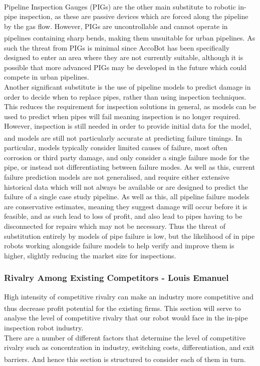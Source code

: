 \documentclass[11pt]{article}		%
\newcommand{\supercite}[1]{\textsuperscript{\cite{#1}}}		%
\begin{document}
				\\
				Pipeline Inspection Gauges (PIGs) are the other main substitute to robotic in-pipe inspection, as these are passive devices which are forced along the pipeline by the gas flow.
				However, PIGs are uncontrollable and cannot operate in pipelines containing sharp bends\supercite{mills2017advances}, making them unsuitable for urban pipelines.
				As such the threat from PIGs is minimal since AccoBot has been specifically designed to enter an area where they are not currently suitable, although it is possible that more advanced PIGs may be developed in the future which could compete in urban pipelines.
				\\
				Another significant substitute is the use of pipeline models to predict damage in order to decide when to replace pipes, rather than using inspection techniques.
				This reduces the requirement for inspection solutions in general, as models can be used to predict when pipes will fail meaning inspection is no longer required.
				However, inspection is still needed in order to provide initial data for the model, and models are still not particularly accurate at predicting failure timings\supercite{zakikhani2020review}.
				In particular, models typically consider limited causes of failure, most often corrosion or third party damage, and only consider a single failure mode for the pipe, or instead not differentiating between failure modes.
				As well as this, current failure prediction models are not generalised, and require either extensive historical data which will not always be available or are designed to predict the failure of a single case study pipeline.
				As well as this, all pipeline failure models are conservative estimates, meaning they suggest damage will occur before it is feasible, and as such lead to loss of profit, and also lead to pipes having to be disconnected for repairs which may not be necessary.
				Thus the threat of substitution entirely by models of pipe failure is low, but the likelihood of in pipe robots working alongside failure models to help verify and improve them is higher, slightly reducing the market size for inspections.
			
			\subsubsection{Rivalry Among Existing Competitors - Louis Emanuel}
				High intensity of competitive rivalry can make an industry more competitive and thus decrease profit potential for the existing firms\supercite{porter2008five}. This section will serve to analyse the level of competitive rivalry that our robot would face in the in-pipe inspection robot industry. \\
		        \hspace*{3ex}There are a number of different factors that determine the level of competitive rivalry such as concentration in industry, switching costs, differentiation, and exit barriers\supercite{rivalryfactorsCI}. And hence this section is structured to consider each of them in turn. 
		        
\end{document}
